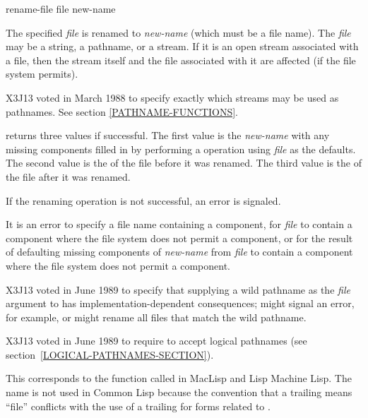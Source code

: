 \begin{defun}[Function]
rename-file file new-name

The specified \emph{file} is renamed to \emph{new-name} (which must be a file name).
The \emph{file} may be a string, a pathname, or a stream.  If it is an open stream
associated with a file, then the stream itself and the file associated
with it are affected (if the file system permits).

\begin{new}
X3J13 voted in March 1988
to specify exactly which streams may be used as pathnames.
See section \ref{PATHNAME-FUNCTIONS}.
\end{new}

 returns three values if successful.  The first value
is the \emph{new-name} with any missing components filled in by performing
a  operation using \emph{file} as the defaults.
The second value is the  of the file before it was renamed.
The third value is the  of the file after it was renamed.

If the renaming operation is not successful, an error is signaled.

\begin{obsolete}
It is an error to specify a file name containing a  component,
for \emph{file} to contain a {\nil} component where the file system does
not permit a {\nil} component, or for the result of defaulting missing
components of \emph{new-name} from \emph{file} to contain a {\nil} component
where the file system does not permit a {\nil} component.
\end{obsolete}
\begin{newer}
X3J13 voted in June 1989 
to specify that supplying a wild pathname
as the \emph{file} argument to  has implementation-dependent consequences;
 might signal an error, for example,
or might rename all files that match the wild pathname.
\end{newer}

\begin{newer}
X3J13 voted in June 1989  to require 
to accept logical pathnames (see section~\ref{LOGICAL-PATHNAMES-SECTION}).
\end{newer}

\beforenoterule
\begin{incompatibility}
This corresponds to the function
called  in MacLisp and Lisp Machine Lisp.
The name  is not used in Common Lisp
because the convention that a trailing  means ``file''
conflicts with the use of a trailing 
for forms related to .
\end{incompatibility}
\afternoterule
\end{defun}

